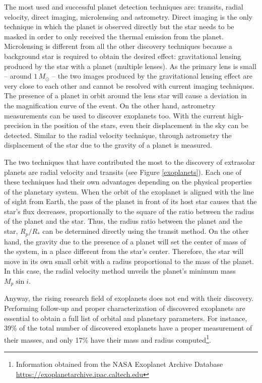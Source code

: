 The most used and successful planet detection techniques are: transits, radial velocity, direct imaging, microlensing and astrometry. Direct imaging is the only technique in which the planet is observed directly but the star needs to be masked in order to only received the thermal emission from the planet. Microlensing is different from all the other discovery techniques because a background star is required to obtain the desired effect: gravitational lensing produced by the star with a planet (multiple lenses). As the primary lens is small -- around $1\,M_{\odot}$ -- the two images produced by the gravitational lensing effect are very close to each other and cannot be resolved with current imaging techniques. The presence of a planet in orbit around the lens star will cause a deviation in the magnification curve of the event. On the other hand, astrometry measurements can be used to discover exoplanets too. With the current high-precision in the position of the stars, even their displacement in the sky can be detected. Similar to the radial velocity technique, through astrometry the displacement of the star due to the gravity of a planet is measured. 

The two techniques that have contributed the most to the discovery of extrasolar planets are radial velocity and transits (see Figure \ref{exoplanets}). Each one of these techniques had their own advantages depending on the physical properties of the planetary system. When the orbit of the exoplanet is aligned with the line of sight from Earth, the pass of the planet in front of its host star causes that the star's flux decreases, proportionally to the square of the ratio between the radius of the planet and the star. Thus, the radius ratio between the planet and the star, $R_{p}/R_{*}$ can be determined directly using the transit method. On the other hand, the gravity due to the presence of a planet will set the center of mass of the system, in a place different from the star's center. Therefore, the star will move in its own small orbit with a radius proportional to the mass of the planet. In this case, the radial velocity method unveils the planet's minimum mass $M_{p}\sin i$. 

Anyway, the rising research field of exoplanets does not end with their discovery. Performing follow-up and proper characterization of discovered exoplanets are essential to obtain a full list of orbital and planetary parameters. For instance,  39\%  of the total number of discovered exoplanets have a proper measurement of their masses, and only 17\% have their mass and radius computed\footnote{Information obtained from the NASA Exoplanet Archive Database \url{https://exoplanetarchive.ipac.caltech.edu}}. 


